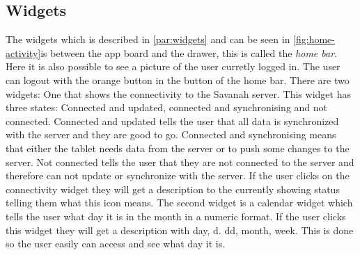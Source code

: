 \subsection{Widgets}

The widgets which is described in \autoref{par:widgets} and can be seen in \autoref{fig:home-activity}is between the app board and the drawer, this is called the \textit{home bar}. Here it is also possible to see a picture of the user curretly logged in. The user can logout with the orange button in the button of the home bar. There are two widgets: One that shows the connectivity to the Savanah server. This widget has three states: Connected and updated, connected and synchronising and not connected. Connected and updated tells the user that all data is synchronized with the server and they are good to go. Connected and synchronising means that either the tablet needs data from the server or to push some changes to the server. Not connected tells the user that they are not connected to the server and therefore can not update or synchronize with the server.
If the user clicks on the connectivity widget they will get a description to the currently showing status telling them what this icon means.
The second widget is a calendar widget which tells the user what day it is in the month in a numeric format. If the user clicks this widget they will get a description with day, d. dd, month, week. This is done so the user easily can access and see what day it is.


\begin{lstlisting}[style=sourceCode, language=JAVA, caption=This is code, label=lst:homeActivity] 
\end{lstlisting}